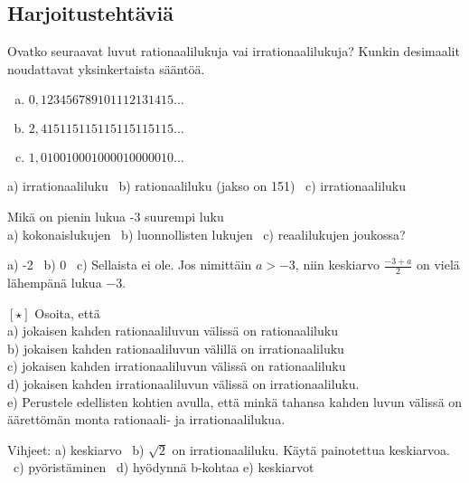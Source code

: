 \subsection*{Harjoitustehtäviä}

\begin{tehtava}
Ovatko seuraavat luvut rationaalilukuja vai irrationaalilukuja? Kunkin desimaalit
noudattavat yksinkertaista sääntöä.
\begin{enumerate}[a)]
\item $0,123456789101112131415 \ldots$
\item $2,415115115115115115115 \ldots$
\item $1,010010001000010000010 \ldots$
\end{enumerate}
\begin{vastaus}
a) irrationaaliluku \ b) rationaaliluku (jakso on 151) \ c) irrationaaliluku
\end{vastaus}
\end{tehtava}

\begin{tehtava}
Mikä on pienin lukua -3 suurempi luku \\
a) kokonaislukujen \ b) luonnollisten lukujen \ c) reaalilukujen joukossa?
\begin{vastaus}
a) -2 \ b) 0 \ c) Sellaista ei ole. Jos nimittäin $a > -3$, niin keskiarvo
$\frac{-3+a}{2}$ on vielä lähempänä lukua $-3$. 
\end{vastaus}
\end{tehtava}

\begin{tehtava}
$\boldsymbol{[\star]}$ Osoita, että \\
a) jokaisen kahden rationaaliluvun välissä on rationaaliluku \\
b) jokaisen kahden rationaaliluvun välillä on irrationaaliluku \\
c) jokaisen kahden irrationaaliluvun välissä on rationaaliluku \\
d) jokaisen kahden irrationaaliluvun välissä on irrationaaliluku. \\
e) Perustele edellisten kohtien avulla, että minkä tahansa kahden luvun
välissä on äärettömän monta rationaali- ja irrationaalilukua.
\begin{vastaus}
Vihjeet: a) keskiarvo \ b) $\sqrt{2}$ on irrationaaliluku. Käytä
painotettua keskiarvoa. \ c) pyöristäminen \ d) hyödynnä b-kohtaa
e) keskiarvot
\end{vastaus}
\end{tehtava}
